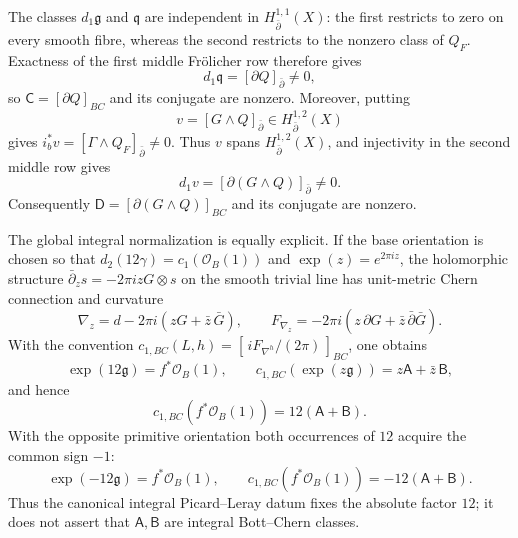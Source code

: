 \begin{enumerate}[leftmargin=1.8em,itemsep=.65em]
The classes $d_1\mathfrak g$ and $\mathfrak q$ are independent in
$H^{1,1}_{\bar\partial}(X)$: the first restricts to zero on every smooth
fibre, whereas the second restricts to the nonzero class of $Q_F$.
Exactness of the first middle Fr\"olicher row therefore gives
\[
 d_1\mathfrak q=[\partial Q]_{\bar\partial}\ne0,
\]
so $\mathsf C=[\partial Q]_{BC}$ and its conjugate are nonzero.  Moreover,
putting
\[
 v=[G\wedge Q]_{\bar\partial}\in H^{1,2}_{\bar\partial}(X)
\]
gives
$i_b^*v=[\Gamma\wedge Q_F]_{\bar\partial}\ne0$.  Thus $v$ spans
$H^{1,2}_{\bar\partial}(X)$, and injectivity in the second middle row gives
\[
 d_1v=[\partial(G\wedge Q)]_{\bar\partial}\ne0.
\]
Consequently $\mathsf D=[\partial(G\wedge Q)]_{BC}$ and its conjugate are
nonzero.

The global integral normalization is equally explicit.  If the base
orientation is chosen so that
$d_2(12\gamma)=c_1(\mathcal O_B(1))$ and
$\exp(z)=e^{2\pi iz}$, the holomorphic structure
$\bar\partial_zs=-2\pi izG\otimes s$ on the smooth trivial line has
unit-metric Chern connection and curvature
\[
 \nabla_z=d-2\pi i(zG+\bar z\,\bar G),\qquad
 F_{\nabla_z}=-2\pi i
 (z\,\partial G+\bar z\,\bar\partial\bar G).
\]
With the convention
$c_{1,BC}(L,h)=[\,iF_{\nabla^h}/(2\pi)\,]_{BC}$, one obtains
\[
 \exp(12\mathfrak g)=f^*\mathcal O_B(1),\qquad
 c_{1,BC}(\exp(z\mathfrak g))
 =z\mathsf A+\bar z\,\mathsf B,
\]
and hence
\[
 c_{1,BC}(f^*\mathcal O_B(1))=12(\mathsf A+\mathsf B).
\]
With the opposite primitive orientation both occurrences of $12$ acquire
the common sign $-1$:
\[
 \exp(-12\mathfrak g)=f^*\mathcal O_B(1),\qquad
 c_{1,BC}(f^*\mathcal O_B(1))=-12(\mathsf A+\mathsf B).
\]
Thus the canonical integral Picard--Leray datum fixes the absolute factor
$12$; it does not assert that $\mathsf A,\mathsf B$ are integral
Bott--Chern classes.


\end{enumerate}
